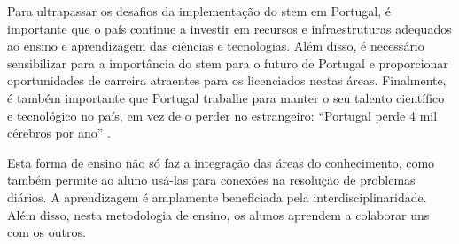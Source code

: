 
Para ultrapassar os desafios da implementação do \acrshort{stem} em Portugal, é importante que o país continue a investir em recursos e infraestruturas adequados ao ensino e aprendizagem das ciências e tecnologias. Além disso, é necessário sensibilizar para a importância do \acrshort{stem} para o futuro de Portugal e proporcionar oportunidades de carreira atraentes para os licenciados nestas áreas. Finalmente, é também importante que Portugal trabalhe para manter o seu talento científico e tecnológico no país, em vez de o perder no estrangeiro: ``Portugal perde 4 mil cérebros por ano'' \cite{Cerdeira2020}.






Esta forma de ensino não só faz a integração das áreas do conhecimento, como também permite ao aluno usá-las para conexões na resolução de problemas diários. A aprendizagem é amplamente beneficiada pela interdisciplinaridade. Além disso, nesta metodologia de ensino, os alunos aprendem a colaborar uns com os outros.

